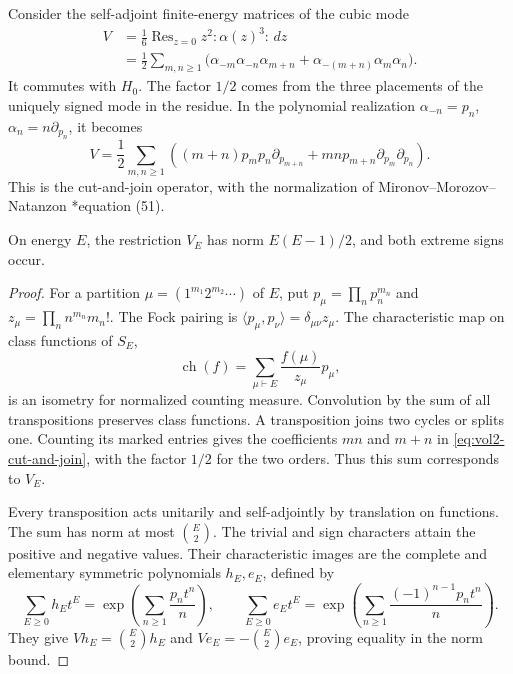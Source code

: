 Consider the self-adjoint finite-energy matrices of the cubic mode
\begin{equation}\label{eq:vol2-cubic-mode}
 \begin{split}
 V&=\frac16\operatorname{Res}_{z=0}z^2{:}\alpha(z)^3{:}\,dz\\
  &=\frac12\sum_{m,n\geq1}
   \bigl(\alpha_{-m}\alpha_{-n}\alpha_{m+n}
          +\alpha_{-(m+n)}\alpha_m\alpha_n\bigr).
 \end{split}
\end{equation}
It commutes with \(H_0\). The factor \(1/2\) comes from the
three placements of the uniquely signed mode in the residue.
In the polynomial realization \(\alpha_{-n}=p_n\),
\(\alpha_n=n\partial_{p_n}\), it becomes
\begin{equation}\label{eq:vol2-cut-and-join}
 V=\frac12\sum_{m,n\geq1}
 \left((m+n)p_mp_n\partial_{p_{m+n}}
       +mn p_{m+n}\partial_{p_m}\partial_{p_n}\right).
\end{equation}
This is the cut-and-join operator, with the normalization of
Mironov--Morozov--Natanzon \cite{MironovMorozovNatanzon2009}*{equation (51)}.

\begin{lemma}\label{lem:vol2-cubic-norm}
On energy \(E\), the restriction \(V_E\) has norm
\(E(E-1)/2\), and both extreme signs occur.
\end{lemma}

\begin{proof}
For a partition \(\mu=(1^{m_1}2^{m_2}\cdots)\) of \(E\), put
\(p_\mu=\prod_n p_n^{m_n}\) and
\(z_\mu=\prod_n n^{m_n}m_n!\). The Fock pairing is
\(\langle p_\mu,p_\nu\rangle=\delta_{\mu\nu}z_\mu\).
The characteristic map on class functions of \(S_E\),
\[
 \operatorname{ch}(f)=\sum_{\mu\vdash E}\frac{f(\mu)}{z_\mu}p_\mu,
\]
is an isometry for normalized counting measure. Convolution by the
sum of all transpositions preserves class functions. A transposition
joins two cycles or splits one. Counting its marked entries gives
the coefficients \(mn\) and \(m+n\) in
\eqref{eq:vol2-cut-and-join}, with the factor \(1/2\) for the two
orders. Thus this sum corresponds to \(V_E\).

Every transposition acts unitarily and self-adjointly by translation
on functions. The sum has norm at most \(\binom E2\).
The trivial and sign characters attain the positive and negative
values. Their characteristic images are the complete and elementary
symmetric polynomials \(h_E,e_E\), defined by
\[
 \sum_{E\geq0}h_Et^E
 =\exp\!\left(\sum_{n\geq1}\frac{p_nt^n}{n}\right),\qquad
 \sum_{E\geq0}e_Et^E
 =\exp\!\left(\sum_{n\geq1}\frac{(-1)^{n-1}p_nt^n}{n}\right).
\]
They give \(Vh_E=\binom E2h_E\) and
\(Ve_E=-\binom E2e_E\), proving equality in the norm bound.
\end{proof}

